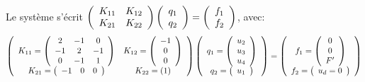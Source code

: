 Le système s'écrit
$\left( \begin{array}{cc} K_{11} & K_{12}\\ K_{21} & K_{22} \end{array}\right)
\left( \begin{array}{c} q_1\\ q_2 \end{array}\right) =
\left( \begin{array}{c} f_1\\ f_2 \end{array}\right) 
$, avec:
\begin{equation}
\left( \begin{array}{cc} 
  K_{11}=\left( \begin{array}{ccc} 2 & -1 & 0 \\ -1 & 2 & -1\\ 0 & -1 & 1 \end{array}\right) &
  K_{12}= \left( \begin{array}{c} -1 \\ 0\\ 0 \end{array}\right)\\
  K_{21} =\left( \begin{array}{ccc} -1 & 0 & 0 \end{array}\right) &
  K_{22} =\left( 1\right)
\end{array}\right)
\left( \begin{array}{c} q_1=\left( \begin{array}{c} u_2\\u_3\\u_4 \end{array}\right) \\
q_2 =\left( \begin{array}{c} u_1 \end{array}\right)\end{array}\right)
=
\left(  \begin{array}{c} f_1 =\left( \begin{array}{c} 0\\0\\F' \end{array}\right)\\ 
f_2=\left( \begin{array}{c} u_d=0 \end{array}\right)\end{array}\right)
\end{equation}


